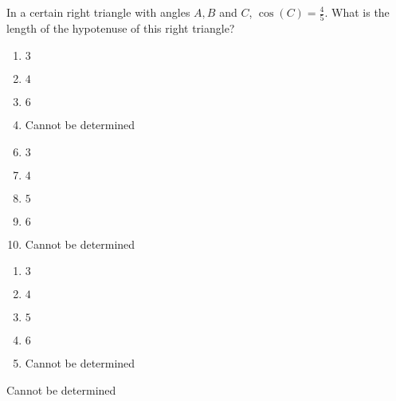 


  In a certain right triangle with angles $A,B$ and $C$, $\cos(C)=\frac{4}{5}$.  What is the length of the hypotenuse of this right triangle?


\ifsat
	\begin{enumerate}[label=\Alph*)]
		\item    $3$
		\item  $4$ 
		\item $6$
		\item  Cannot be determined %
	\end{enumerate}
\else
\fi

\ifacteven
	\begin{enumerate}[label=\textbf{\Alph*.},itemsep=\fill,align=left]
		\setcounter{enumii}{5}
		\item    $3$
		\item  $4$ 
		\item $5$
		\addtocounter{enumii}{1}
		\item $6$
		\item  Cannot be determined %
	\end{enumerate}
\else
\fi

\ifactodd
	\begin{enumerate}[label=\textbf{\Alph*.},itemsep=\fill,align=left]
		\item    $3$
		\item  $4$ 
		\item $5$
		\item $6$
		\item  Cannot be determined %
	\end{enumerate}
\else
\fi

\ifgridin
  Cannot be determined %

\else
\fi

